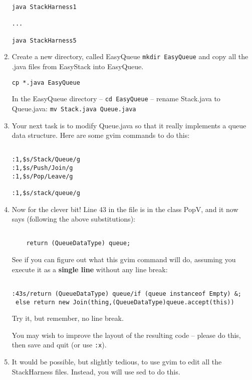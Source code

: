 \begin{enumerate}
\begin{verbatim}
java StackHarness1

...

java StackHarness5
\end{verbatim}

\item Create a new directory, called EasyQueue {\tt mkdir EasyQueue} 
and copy all the .java
files from EasyStack into EasyQueue.  
\begin{verbatim}
cp *.java EasyQueue
\end{verbatim}

In the EasyQueue directory -- {\tt cd EasyQueue} -- rename
Stack.java to Queue.java: {\tt mv Stack.java Queue.java}

\item Your next task is to modify Queue.java so that it really implements
a queue data structure. Here are some gvim commands to do this:
\begin{verbatim}

:1,$s/Stack/Queue/g
:1,$s/Push/Join/g
:1,$s/Pop/Leave/g

:1,$s/stack/queue/g

\end{verbatim}

\item Now for the clever bit!  Line 43 in the file is in the class PopV,
and it now says (following the above substitutions):

\begin{verbatim}

    return (QueueDataType) queue;

\end{verbatim}

See if you can figure out what this gvim command will do, assuming
you execute it as a {\bf single line} without any line break:

\begin{verbatim}

:43s/return (QueueDataType) queue/if (queue instanceof Empty) &;
 else return new Join(thing,(QueueDataType)queue.accept(this))

\end{verbatim}

Try it, but remember, no line break.

You may wish to improve the layout of the resulting code -- please
do this, then save and quit (or use {\tt :x}).

\item It would be possible, but slightly tedious, to use gvim to
edit all the StackHarness files.  Instead, you will use sed to do
this.


\end{enumerate}
